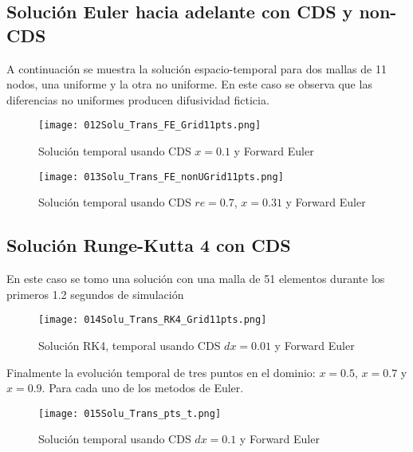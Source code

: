 \documentclass[9pt,technote,twoside,letterpaper,onecolumn]{IEEEtran}
\begin{document}
\begin{multicols}{2}
\subsection{Solución Euler hacia adelante con CDS y non-CDS}
\label{sec:sol_ucds_noncds}

A continuación se muestra la solución espacio-temporal para dos mallas de 11 nodos, una uniforme y la otra no uniforme. En este caso se observa que las diferencias no uniformes producen difusividad ficticia.
\begin{figure}[H]
  \centering
  \texttt{[image: 012Solu\_Trans\_FE\_Grid11pts.png]}
  \caption{Solución temporal usando CDS $x=0.1$ y Forward Euler}
  \label{fig:trans_sol_cds_dx01}
\end{figure}

\begin{figure}[H]
  \centering
  \texttt{[image: 013Solu\_Trans\_FE\_nonUGrid11pts.png]}
  \caption{Solución temporal usando CDS $re=0.7$, $x=0.31$ y Forward Euler}
  \label{fig:trans_sol_non-cds_dx01}
\end{figure}

\subsection{Solución Runge-Kutta 4 con CDS}
\label{sec:sol_ucds_rk4_noncds}

En este caso se tomo una solución con una malla de 51 elementos durante los primeros 1.2 segundos de simulación
\begin{figure}[H]
  \centering
  \texttt{[image: 014Solu\_Trans\_RK4\_Grid11pts.png]}
  \caption{Solución RK4, temporal usando CDS $dx=0.01$ y Forward Euler}
  \label{fig:trans_sol_rk4-cds_dx01}
\end{figure}

Finalmente la evolución temporal de tres puntos en el dominio: $x=0.5$, $x=0.7$ y $x=0.9$. Para cada uno de los metodos de Euler.
\begin{figure}[H]
  \centering
  \texttt{[image: 015Solu\_Trans\_pts\_t.png]}
  \caption{Solución temporal usando CDS $dx=0.1$ y Forward Euler}
  \label{fig:trans_sol_pts_time_evol}
\end{figure}



\end{multicols}
\end{document}
